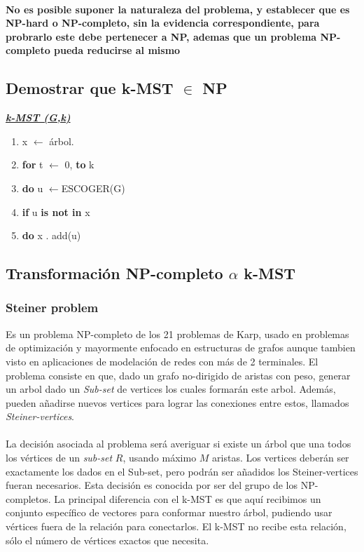 \documentclass[spanish,12pt]{elsarticle}
\newcommand{\blank}[1]{\hspace*{#1}}
\begin{document}
\paragraph{\textnormal{No es posible suponer la naturaleza del problema, y establecer que es NP-hard o NP-completo, sin la evidencia correspondiente, para probrarlo este debe pertenecer a NP, ademas que un problema NP-completo pueda reducirse al mismo}}
\subsection{Demostrar que k-MST $\in$ NP}
\textit{\underline{\textbf{k-MST (G,k)}} }
\begin{enumerate}

    \item \textnormal{x $\leftarrow$ árbol.}
    
    \item  \textnormal{\textbf{for} t $\leftarrow$ 0,
    \textbf{to} k}
    
    \item \textnormal{\blank{1cm}\textbf{do} u $\leftarrow${ESCOGER(G)}}
     
    \item  \textnormal{\blank{2cm}\textbf{if} u \textbf{is not in} x}
    
    \item \textnormal{\blank{3cm}\textbf{do} x . add(u)}
    
\end{enumerate}


\subsection{Transformación NP-completo $\alpha$  k-MST}
\subsubsection{Steiner problem}
Es un problema NP-completo de los 21 problemas de Karp, usado en problemas de optimización y mayormente enfocado en estructuras de grafos aunque tambien visto en aplicaciones de modelación de redes con más de 2 terminales. El problema consiste en que, dado un grafo no-dirigido de aristas con peso, generar un arbol dado un
\textit{Sub-set} de vertices los cuales formarán este arbol. Además, pueden añadirse nuevos vertices para lograr las conexiones entre estos, llamados \textit{Steiner-vertices}.\\\\
La decisión asociada al problema será averiguar si existe un árbol que una todos los vértices de un \textit{sub-set} $R$, usando máximo $M$ aristas. Los vertices deberán ser exactamente los dados en el Sub-set, pero podrán ser añadidos los Steiner-vertices fueran necesarios. Esta decisión es conocida por ser del grupo de los NP-completos.
La principal diferencia con el k-MST es que aquí recibimos un conjunto específico de vectores para conformar nuestro árbol, pudiendo usar vértices fuera de la relación para conectarlos. El k-MST no recibe esta relación, sólo el número de vértices exactos que necesita.\\ 
\end{document}
